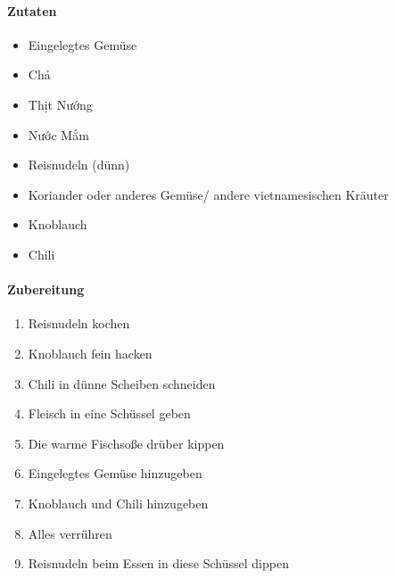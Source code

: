 \newpage
{}
\paragraph{Zutaten}
\begin{itemize}[noitemsep]
	\item Eingelegtes Gemüse
	\item Chả
	\item Thịt Nướng 
	\item Nước Mắm 
	\item Reisnudeln (dünn)
	\item Koriander oder anderes Gemüse/ andere vietnamesischen Kräuter
	\item Knoblauch
	\item Chili
\end{itemize}

\paragraph{Zubereitung}
\begin{enumerate}[noitemsep]
	\item Reisnudeln kochen
	\item Knoblauch fein hacken
	\item Chili in dünne Scheiben schneiden
	\item Fleisch in eine Schüssel geben
	\item Die warme Fischsoße drüber kippen
	\item Eingelegtes Gemüse hinzugeben
	\item Knoblauch und Chili hinzugeben
	\item Alles verrühren
	\item Reisnudeln beim Essen in diese Schüssel dippen
\end{enumerate}
